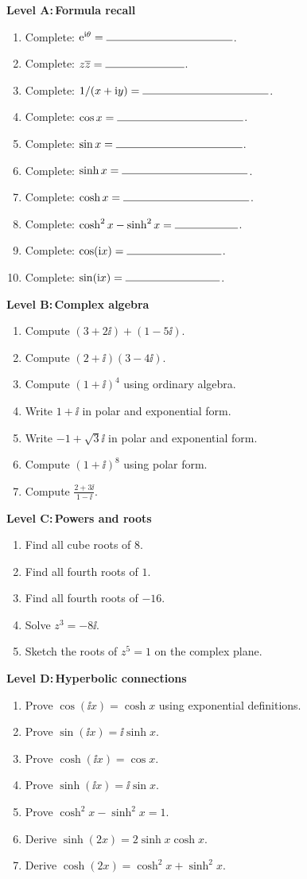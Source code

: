 \documentclass{otscience}
\begin{document}
\begin{practicebox}
\textbf{Level A:\,Formula recall}

\begin{enumerate}
\item Complete: \(\ee^{\ii\theta}=\blank[4cm]\).
\item Complete: \(z\overline{z}=\blank[2.5cm]\).
\item Complete: \(1/(x+\ii y)=\blank[4cm]\).
\item Complete: \(\cos x=\blank[4cm]\).
\item Complete: \(\sin x=\blank[4cm]\).
\item Complete: \(\sinh x=\blank[4cm]\).
\item Complete: \(\cosh x=\blank[4cm]\).
\item Complete: \(\cosh^2x-\sinh^2x=\blank[2cm]\).
\item Complete: \(\cos(\ii x)=\blank[3cm]\).
\item Complete: \(\sin(\ii x)=\blank[3cm]\).
\end{enumerate}


\textbf{Level B:\,Complex algebra}
\begin{enumerate}
\item Compute \((3+2\ii)+(1-5\ii)\).
\item Compute \((2+\ii)(3-4\ii)\).
\item Compute \({(1+\ii)}^4\) using ordinary algebra.
\item Write \(1+\ii\) in polar and exponential form.
\item Write \(-1+\sqrt3\ii\) in polar and exponential form.
\item Compute \({(1+\ii)}^8\) using polar form.
\item Compute \(\frac{2+3\ii}{1-\ii}\).
\end{enumerate}

\textbf{Level C:\,Powers and roots}
\begin{enumerate}
\item Find all cube roots of \(8\).
\item Find all fourth roots of \(1\).
\item Find all fourth roots of \(-16\).
\item Solve \(z^3=-8\ii\).
\item Sketch the roots of \(z^5=1\) on the complex plane.
\end{enumerate}

\textbf{Level D:\,Hyperbolic connections}
\begin{enumerate}
\item Prove \(\cos(\ii x)=\cosh x\) using exponential definitions.
\item Prove \(\sin(\ii x)=\ii\sinh x\).
\item Prove \(\cosh(\ii x)=\cos x\).
\item Prove \(\sinh(\ii x)=\ii\sin x\).
\item Prove \(\cosh^2x-\sinh^2x=1\).
\item Derive \(\sinh(2x)=2\sinh x\cosh x\).
\item Derive \(\cosh(2x)=\cosh^2x+\sinh^2x\).
\end{enumerate}


\end{practicebox}
\end{document}
